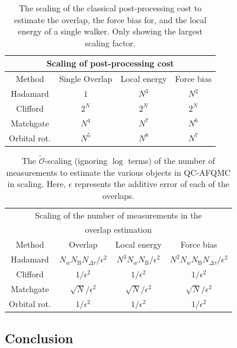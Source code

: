 \documentclass[../main.tex]{subfiles}
\begin{document}
\begin{table}[tb]
\begin{tabular}{c|c|c|c}
\hline
 \multicolumn{4}{c}{Scaling of post-processing cost} \\
\hline\hline
Method    & Single Overlap            & Local energy       & Force bias         \\ \hline
Hadamard  & $1$   & $N^3$ & $N^2$ \\ \hline
Clifford  & $2^N$ & $2^N$ & $2^N$ \\ \hline
Matchgate & $N^4$ & $N^7$ & $N^6$ \\ \hline
Orbital rot.  & $N^5$ & $N^{8}$ & $N^7$ \\ 
\end{tabular}
\caption{The scaling of the classical post-processing cost to estimate the overlap, the force bias for, and the local energy of a single walker. Only showing the largest scaling factor.}
\label{table:classical_scaling}
\end{table}


\begin{table}[t!]
\begin{tabular}{c|c|c|c}
\hline
 \multicolumn{4}{c}{Scaling of the number of measurements in the}  \\\multicolumn{4}{c}{overlap estimation} \\
\hline
\hline
Method & Overlap & Local energy  & Force bias              \\ \hline
Hadamard   & $N_{w}N_\mathrm{B}N_{\Delta\tau}/\epsilon^2$ & $N^3N_{w}N_\mathrm{B}/\epsilon^2$ & $N^2N_{w}N_\mathrm{B}N_{\Delta\tau}/\epsilon^2$ \\ \hline
Clifford   & $1/\epsilon^2$ & $1/\epsilon^2$ & $1/\epsilon^2$ \\ \hline
Matchgate  & $\sqrt{N}/\epsilon^2$ & $\sqrt{N}/\epsilon^2$ & $\sqrt{N}/\epsilon^2$ \\ \hline
Orbital rot.  & $1/\epsilon^2$ & $1/\epsilon^2$ & $1/\epsilon^2$ \\ 
\end{tabular}
\caption{The $\tilde{\mathcal O}$-scaling (ignoring $\log$ terms) of the number of measurements to estimate the various objects in QC-AFQMC in scaling. Here, $\epsilon$ represents the additive error of each of the overlaps.}
\label{table:quantum_scaling}
\end{table}

\subsection{Conclusion}
\end{document}
